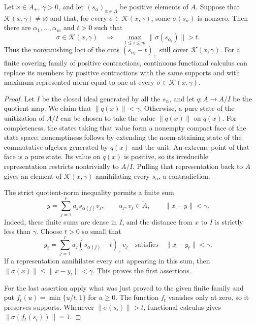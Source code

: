 \begin{lemma}\label{norm:finite-cover}
Let \(x\in A_+\), \(\gamma>0\), and let
\((s_\alpha)_{\alpha\in\Lambda}\) be positive elements of \(A\).
Suppose that \(\mathcal K(x,\gamma)\ne\varnothing\) and that, for
every \(\sigma\in\mathcal K(x,\gamma)\), some
\(\sigma(s_\alpha)\) is nonzero.  Then there are
\(\alpha_1,\ldots,\alpha_m\) and \(t>0\) such that
\[
 \sigma\in\mathcal K(x,\gamma)
 \quad\Longrightarrow\quad
 \max_{1\le i\le m}\|\sigma(s_{\alpha_i})\|>t.
\]
Thus the nonvanishing loci of the cuts
\((s_{\alpha_i}-t)_+\) still cover \(\mathcal K(x,\gamma)\).
For a finite covering family of positive contractions, continuous
functional calculus can replace its members by positive contractions
with the same supports and with maximum represented norm equal to one
at every \(\sigma\in\mathcal K(x,\gamma)\).
\end{lemma}

\begin{proof}
Let \(I\) be the closed ideal generated by all the \(s_\alpha\), and let
\(q:A\to A/I\) be the quotient map.  We claim that
\(\|q(x)\|<\gamma\).  Otherwise, a pure state of the unitization of
\(A/I\) can be chosen to take the value \(\|q(x)\|\) on \(q(x)\).
For completeness, the states taking that value form a nonempty compact
face of the state space: nonemptiness follows by extending the
norm-attaining state of the commutative algebra generated by \(q(x)\)
and the unit.  An extreme point of that face is a pure state.
Its value on \(q(x)\) is positive, so its irreducible representation
restricts nontrivially to \(A/I\).  Pulling that representation back to
\(A\) gives an element of \(\mathcal K(x,\gamma)\) annihilating every
\(s_\alpha\), a contradiction.

The strict quotient-norm inequality permits a finite sum
\[
 y=\sum_{j=1}^r u_j s_{\alpha(j)}v_j,\qquad
 u_j,v_j\in\widetilde A,\qquad \|x-y\|<\gamma .
\]
Indeed, these finite sums are dense in \(I\), and the distance from
\(x\) to \(I\) is strictly less than \(\gamma\).  Choose \(t>0\) so
small that
\[
 y_t=\sum_{j=1}^r u_j(s_{\alpha(j)}-t)_+v_j
 \quad\text{satisfies}\quad \|x-y_t\|<\gamma .
\]
If a representation annihilates every cut appearing in this sum, then
\(\|\sigma(x)\|\le\|x-y_t\|<\gamma\).  This proves the first assertions.

For the last assertion apply what was just proved to the given finite
family and put \(f_t(u)=\min\{u/t,1\}\) for \(u\ge0\).
The function \(f_t\) vanishes only at zero, so it preserves supports.
Whenever \(\|\sigma(s_i)\|>t\), functional calculus gives
\(\|\sigma(f_t(s_i))\|=1\).
\end{proof}

